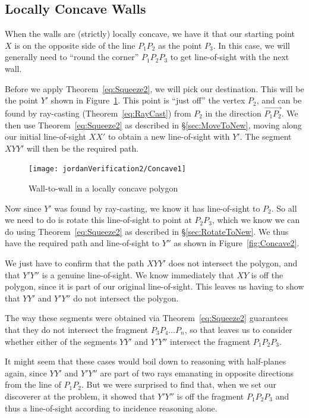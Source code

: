 \subsection{Locally Concave Walls}
When the walls are (strictly) locally concave, we have it that our starting point $X$ is on the opposite side of the line $P_1P_2$ as the point $P_3$. In this case, we will generally need to ``round the corner'' $P_1P_2P_3$ to get line-of-sight with the next wall. 

Before we apply Theorem~\ref{eq:Squeeze2}, we will pick our destination. This will be the point $Y'$ shown in Figure~\ref{fig:Concave1}. This point is ``just off'' the vertex $P_2$, and can be found by ray-casting (Theorem~\ref{eq:RayCast}) from $P_2$ in the direction $\overrightarrow{P_1P_2}$. We then use Theorem~\ref{eq:Squeeze2} as described in \S\ref{sec:MoveToNew}, moving along our initial line-of-sight $XX'$ to obtain a new line-of-sight with $Y'$. The segment $XYY'$ will then be the required path.

\begin{figure}
\centering\texttt{[image: jordanVerification2/Concave1]}
\caption{Wall-to-wall in a locally concave polygon}
\label{fig:Concave1}
\end{figure}

Now since $Y'$ was found by ray-casting, we know it has line-of-sight to $P_2$. So all we need to do is rotate this line-of-sight to point at $P_2P_3$, which we know we can do using Theorem~\ref{eq:Squeeze2} as described in \S\ref{sec:RotateToNew}. We thus have the required path and line-of-sight to $Y''$ as shown in Figure~\ref{fig:Concave2}.

We just have to confirm that the path $XYY'$ does not intersect the polygon, and that $Y'Y''$ is a genuine line-of-sight. We know immediately that $XY$ is off the polygon, since it is part of our original line-of-sight. This leaves us having to show that $YY'$ and $Y'Y''$ do not intersect the polygon. 

The way these segments were obtained via Theorem~\ref{eq:Squeeze2} guarantees that they do not intersect the fragment $P_3P_4\ldots P_n$, so that leaves us to consider whether either of the segments $YY'$ and $Y'Y''$ intersect the fragment $P_1P_2P_3$. 

It might seem that these cases would boil down to reasoning with half-planes again, since $YY'$ and $Y'Y''$ are part of two rays emanating in opposite directions from the line of $P_1P_2$. But we were surprised to find that, when we set our discoverer at the problem, it showed that $Y'Y''$ is off the fragment $P_1P_2P_3$ and thus a line-of-sight according to incidence reasoning alone.

